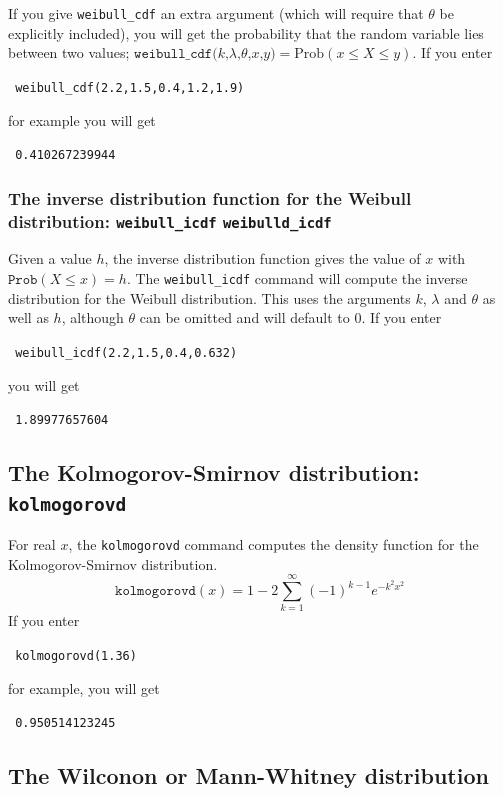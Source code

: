 \documentclass[a4paper,11pt]{book}
\begin{document}
If you give \texttt{weibull\_cdf} an extra argument (which will
require that $\theta$ be explicitly included), you will get the probability that
the random variable lies between two values;
$\texttt{weibull\_cdf($k$,$\lambda$,$\theta$,$x$,$y$)} = \text{Prob}(x \le X \le y)$.  If you
enter
\begin{center}
  \tt
  weibull\_cdf(2.2,1.5,0.4,1.2,1.9)
\end{center}
for example you will get
\begin{center}
  \tt
  0.410267239944
\end{center}

\subsubsection{The inverse distribution function for the Weibull distribution: \texttt{weibull\_icdf} \texttt{weibulld\_icdf}}

Given a value $h$, the inverse distribution function gives
the value of $x$ with $\texttt{Prob}(X \le x) = h$.
The \texttt{weibull\_icdf} command will compute the
inverse distribution for the Weibull distribution.  This uses the
arguments $k$, $\lambda$ and $\theta$ as well as $h$, although
$\theta$ can be omitted and will default to 0.
If you enter
\begin{center}
  \tt
  weibull\_icdf(2.2,1.5,0.4,0.632)
\end{center}
you will get
\begin{center}
  \tt
  1.89977657604
\end{center}

\subsection{The Kolmogorov-Smirnov distribution: \texttt{kolmogorovd}}

For real $x$, the \texttt{kolmogorovd} command computes the density
function for the Kolmogorov-Smirnov distribution.  
\[
\texttt{kolmogorovd}(x) = 1 - 2\sum_{k=1}^{\infty} (-1)^{k-1} e^{-k^2 x^2}
\]
If you enter 
\begin{center}
  \tt
  kolmogorovd(1.36)
\end{center}
for example, you will get
\begin{center}
  \tt
  0.950514123245
\end{center}

\subsection{The Wilconon or Mann-Whitney distribution}
\end{document}
